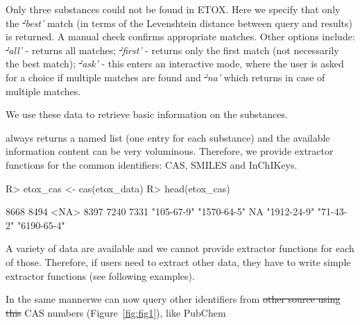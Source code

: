 \documentclass[article, shortnames]{jss}\usepackage[]{graphicx}\usepackage[]{color}
\providecommand{\DIFadd}[1]{{\protect\color{green}\uwave{#1}}} %
\providecommand{\DIFdel}[1]{{\protect\color{red}\sout{#1}}}                      %
\providecommand{\DIFaddbegin}{} %
\providecommand{\DIFaddend}{} %
\providecommand{\DIFdelbegin}{} %
\providecommand{\DIFdelend}{} %
\begin{document}
Only three substances could not be found in ETOX. 
Here we specify that only the \emph{\DIFdelbegin \DIFdel{'}\DIFdelend \DIFaddbegin \DIFadd{`}\DIFaddend best'} match (in terms of the Levenshtein distance between query and results) is returned. 
A manual check confirms appropriate matches. 
Other options include: \emph{\DIFdelbegin \DIFdel{'}\DIFdelend \DIFaddbegin \DIFadd{`}\DIFaddend all'} - returns all matches; \emph{\DIFdelbegin \DIFdel{'}\DIFdelend \DIFaddbegin \DIFadd{`}\DIFaddend first'} - returns only the first match (not necessarily the best match); \emph{\DIFdelbegin \DIFdel{'}\DIFdelend \DIFaddbegin \DIFadd{`}\DIFaddend ask'} - this enters an interactive mode, where the user is asked for a choice if multiple matches are found and \emph{\DIFdelbegin \DIFdel{'}\DIFdelend \DIFaddbegin \DIFadd{`}\DIFaddend na'} which returns  in case of multiple matches.

We use these data to retrieve basic information on the substances.

\begin{CodeChunk}
\end{CodeChunk}

 always returns a named list (one entry for each substance) and the available information content can be very voluminous.
Therefore, we provide extractor functions for the common identifiers: CAS, SMILES and InChIKeys.
\begin{CodeChunk}
\begin{CodeInput}
R> etox_cas <- cas(etox_data)
R> head(etox_cas)
\end{CodeInput}
\begin{CodeOutput}
       8668        8494        <NA>        8397        7240        7331 
 "105-67-9" "1570-64-5"          NA "1912-24-9"   "71-43-2" "6190-65-4" 
\end{CodeOutput}
\end{CodeChunk}

A variety of data are available and we cannot provide extractor functions for each of those.
Therefore, if users need to extract other data, they have to write simple extractor functions (see following examples).

In the same manner\DIFaddbegin \DIFadd{, }\DIFaddend we can now query other identifiers from \DIFdelbegin \DIFdel{other source using this }\DIFdelend \DIFaddbegin \DIFadd{another source using these }\DIFaddend CAS numbers (Figure~\ref{fig:fig1}), like PubChem
\DIFaddbegin \begin{CodeChunk}
\end{CodeChunk}
\DIFaddend 
\end{document}
